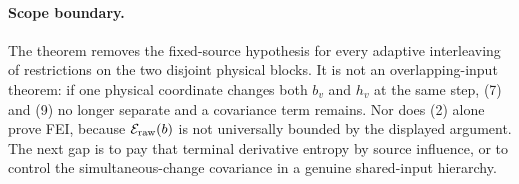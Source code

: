 \paragraph{Scope boundary.}
The theorem removes the fixed-source hypothesis for every adaptive
interleaving of restrictions on the two disjoint physical blocks.  It is not
an overlapping-input theorem: if one physical coordinate changes both
\(b_v\) and \(h_v\) at the same step, (7) and (9) no longer separate and a
covariance term remains.  Nor does (2) alone prove FEI, because
\(\mathcal E_{\rm raw}(b)\) is not universally bounded by the displayed
argument.  The next gap is to pay that terminal derivative entropy by source
influence, or to control the simultaneous-change covariance in a genuine
shared-input hierarchy.
